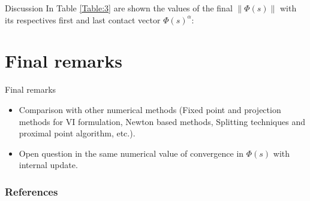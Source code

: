\documentclass[8pt,red]{beamer}
\theoremstyle{plain}
\theoremstyle{definition}
\theoremstyle{remark}
\begin{document}
\begin{frame}{Discussion}
In Table \ref{Table:3} are shown the values of the final $\| \Phi(s) \|$ with its respectives first and last contact vector $\Phi(s)^{\alpha}$:
\begin{table}[h!]
\caption{Comparison of s-update}
\label{Table:3}
\end{table}

\end{frame}

\section{Final remarks}
\begin{frame}{Final remarks}
\begin{itemize}
\item Comparison with other numerical methods (Fixed point and projection methods for VI formulation, Newton based methods, Splitting techniques and proximal point algorithm, etc.).
\item Open question in the same numerical value of convergence in  $\Phi(s)$ with internal update.
\end{itemize}
\end{frame}

\begin{frame}[allowframebreaks]
\frametitle{References}


\end{frame}
\end{document}
